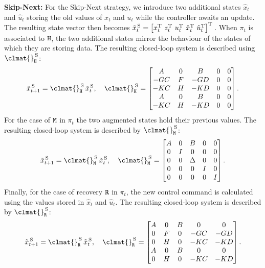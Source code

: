 \textbf{Skip-Next: }%
%
For the Skip-Next strategy, we introduce two additional states $\hat x_t$ and $\hat u_t$ storing the old values of $x_t$ and $u_t$ while the controller awaits an update.
The resulting state vector then becomes $\tilde x_t^{\,\text{S}} = \left[ x_t^{\mathrm{\small{T}}}{}\,\,z_t^{\mathrm{\small{T}}}{}\,\, u_t^{\mathrm{\small{T}}}{}\,\, \hat{x}_t^{\mathrm{\small{T}}}{}\,\, \hat{u}_t^{\mathrm{\small{T}}}{} \right]^{\mathrm{\small{T}}}{}$.
When $\pi_t$ is associated to $\texttt{H}$, the two additional states mirror the behaviour of the states of which they are storing data.
The resulting closed-loop system is described using $\clmat{}^{\,\text{S}}_{\cH}$:
%
\begin{equation*}
    \tilde x_{t+1}^{\,\text{S}} = \clmat{}^{\,\text{S}}_{\cH}\,\tilde x_t^{\,\text{S}}, \quad
    \clmat{}^{\,\text{S}}_{\cH} = \begin{bmatrix}
        \Ap       & 0    & \Bp      & 0 & 0 \\
        -\Bc\Cp   & \Ac  & -\Bc\Dp  & 0 & 0 \\
        -\Dc\Cp   & \Cc  & -\Dc\Dp  & 0 & 0 \\
        \Ap       & 0    & \Bp      & 0 & 0 \\
        -\Dc\Cp   & \Cc  & -\Dc\Dp  & 0 & 0 \\
    \end{bmatrix}.
\end{equation*}
%
For the case of $\texttt{M}$ in $\pi_t$ the two augmented states hold their previous values.
The resulting closed-loop system is described by $\clmat{}^{\,\text{S}}_{\cM}$:
%
\begin{equation*}
    \tilde x_{t+1}^{\,\text{S}} = \clmat{}^{\,\text{S}}_{\cM}\,\tilde x_t^{\,\text{S}}, \quad
    \clmat{}^{\,\text{S}}_{\cM}=\begin{bmatrix}
        \Ap & 0  & \Bp & 0 & 0 \\
        0   & I  & 0   & 0 & 0 \\
        0   & 0  & \Delta   & 0 & 0 \\
        0   & 0  & 0   & I & 0 \\
        0   & 0  & 0   & 0 & I \\
    \end{bmatrix}.
\end{equation*}
%
Finally, for the case of recovery $\texttt{R}$ in $\pi_t$, the new control command is calculated using the values stored in $\hat x_t$ and $\hat u_t$.
The resulting closed-loop system is described by $\clmat{}^{\,\text{S}}_{\cR}$:
%
\begin{equation*}
    \tilde x_{t+1}^{\,\text{S}} = \clmat{}^{\,\text{S}}_{\cR} \, \tilde x_{t}^{\,\text{S}}, \quad
    \clmat{}^{\,\text{S}}_{\cR} = \begin{bmatrix}
        \Ap & 0    & \Bp & 0       & 0 \\
        0   & \Ac  & 0   & -\Bc\Cp & -\Bc\Dp \\
        0   & \Cc  & 0   & -\Dc\Cp & -\Dc\Dp \\
        \Ap & 0    & \Bp & 0       & 0 \\
        0   & \Cc  & 0   & -\Dc\Cp & -\Dc\Dp \\
    \end{bmatrix}.
\end{equation*}
